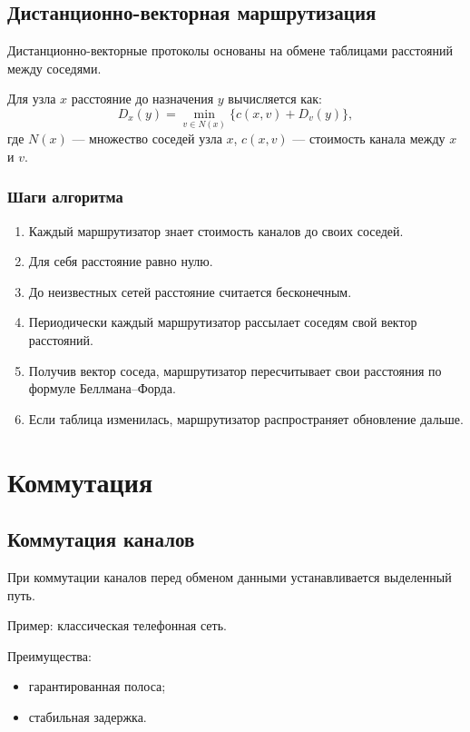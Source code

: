 \documentclass[12pt,a4paper]{article}
\begin{document}
\subsection{Дистанционно-векторная маршрутизация}

Дистанционно-векторные протоколы основаны на обмене таблицами расстояний между соседями.

Для узла $x$ расстояние до назначения $y$ вычисляется как:
\[
D_x(y)=\min_{v \in N(x)} \{c(x,v)+D_v(y)\},
\]
где $N(x)$ --- множество соседей узла $x$, $c(x,v)$ --- стоимость канала между $x$ и $v$.

\subsubsection{Шаги алгоритма}

\begin{enumerate}
    \item Каждый маршрутизатор знает стоимость каналов до своих соседей.
    \item Для себя расстояние равно нулю.
    \item До неизвестных сетей расстояние считается бесконечным.
    \item Периодически каждый маршрутизатор рассылает соседям свой вектор расстояний.
    \item Получив вектор соседа, маршрутизатор пересчитывает свои расстояния по формуле Беллмана--Форда.
    \item Если таблица изменилась, маршрутизатор распространяет обновление дальше.
\end{enumerate}

\section{Коммутация}

\subsection{Коммутация каналов}

При коммутации каналов перед обменом данными устанавливается выделенный путь.

Пример: классическая телефонная сеть.

Преимущества:
\begin{itemize}
    \item гарантированная полоса;
    \item стабильная задержка.
\end{itemize}
\end{document}
